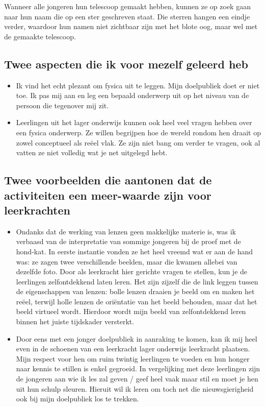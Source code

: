 \documentclass[a4paper,12pt,twoside]{article}%
\begin{document}
	Wanneer alle jongeren hun telescoop gemaakt hebben, kunnen ze op zoek gaan naar hun naam die op een ster geschreven staat. Die sterren hangen een eindje verder, waardoor hun namen niet zichtbaar zijn met het blote oog, maar wel met de gemaakte telescoop. 
	
	\subsection{Twee aspecten die ik voor mezelf geleerd heb}
	\begin{itemize}
		\item Ik vind het echt plezant om fysica uit te leggen. Mijn doelpubliek doet er niet toe. Ik pas mij aan en leg een bepaald onderwerp uit op het niveau van de persoon die tegenover mij zit.
		\item Leerlingen uit het lager onderwijs kunnen ook heel veel vragen hebben over een fysica onderwerp. Ze willen begrijpen hoe de wereld rondom hen draait op zowel conceptueel als reëel vlak. Ze zijn niet bang om verder te vragen, ook al vatten ze niet volledig wat je net uitgelegd hebt.
	\end{itemize}
	
	\subsection{Twee voorbeelden die aantonen dat de activiteiten een meer-waarde zijn voor leerkrachten}
	\begin{itemize}%
		\item Ondanks dat de werking van lenzen geen makkelijke materie is, was ik verbaasd van de interpretatie van sommige jongeren bij de proef met de hond-kat. In eerste instantie vonden ze het heel vreemd wat er aan de hand was: ze zagen twee verschillende beelden, maar die kwamen allebei van dezelfde foto. Door als leerkracht hier gerichte vragen te stellen, kun je de leerlingen zelfontdekkend laten leren. Het zijn zijzelf die de link leggen tussen de eigenschappen van lenzen: bolle lenzen draaien je beeld om en maken het reëel, terwijl holle lenzen de oriëntatie van het beeld behouden, maar dat het beeld virtueel wordt. Hierdoor wordt mijn beeld van zelfontdekkend leren  binnen het juiste tijdskader versterkt.
		\item Door eens met een jonger doelpubliek in aanraking te komen, kan ik mij heel even in de schoenen van een leerkracht lager onderwijs leerkracht plaatsen. Mijn respect voor hen om ruim twintig leerlingen te voeden en hun honger naar kennis te stillen is enkel gegroeid. In vergelijking met deze leerlingen zijn de jongeren aan wie ik les zal geven / geef heel vaak maar stil en moet je hen uit hun schulp sleuren. Hieruit wil ik leren om toch net die nieuwsgierigheid ook bij mijn doelpubliek los te trekken.
	\end{itemize}
	
\end{document}
